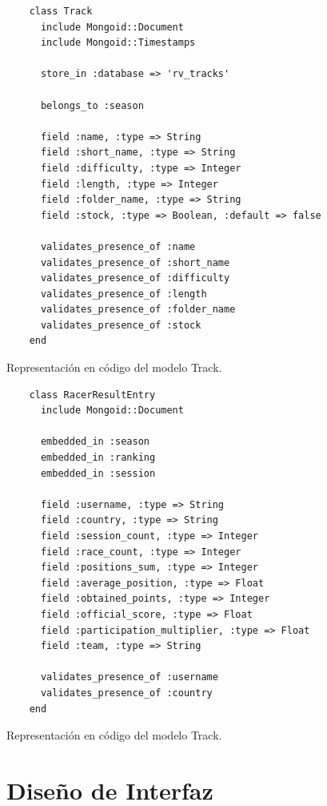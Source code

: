 \begin{listing}
  \begin{verbatim}
    class Track
      include Mongoid::Document
      include Mongoid::Timestamps
      
      store_in :database => 'rv_tracks'
      
      belongs_to :season
      
      field :name, :type => String
      field :short_name, :type => String
      field :difficulty, :type => Integer
      field :length, :type => Integer
      field :folder_name, :type => String
      field :stock, :type => Boolean, :default => false
      
      validates_presence_of :name
      validates_presence_of :short_name
      validates_presence_of :difficulty
      validates_presence_of :length
      validates_presence_of :folder_name
      validates_presence_of :stock
    end
  \end{verbatim}
  \caption[Esquema de Track]{Representación en código del modelo Track.}
\end{listing}

\begin{listing}
  \begin{verbatim}
    class RacerResultEntry
      include Mongoid::Document
      
      embedded_in :season
      embedded_in :ranking
      embedded_in :session
      
      field :username, :type => String
      field :country, :type => String
      field :session_count, :type => Integer
      field :race_count, :type => Integer
      field :positions_sum, :type => Integer
      field :average_position, :type => Float
      field :obtained_points, :type => Integer
      field :official_score, :type => Float
      field :participation_multiplier, :type => Float
      field :team, :type => String
      
      validates_presence_of :username
      validates_presence_of :country
    end
  \end{verbatim}
  \caption[Esquema de Track]{Representación en código del modelo Track.}
\end{listing}

\clearpage

\section{Diseño de Interfaz}

